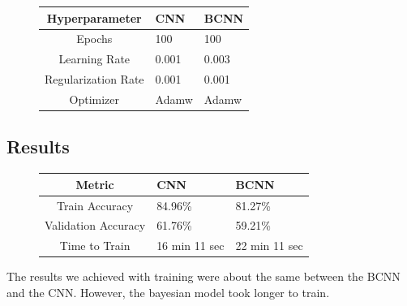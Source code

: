 \documentclass[12pt]{article}
\begin{document}
\begin{figure}[H]
	\begin{center}
	\begin{tabular}{|c||p{3cm}|p{3cm}|} %
	\hline
	\textbf{Hyperparameter} & \textbf{CNN} & \textbf{BCNN} \\ [0.5ex] 
	\hline\hline
	Epochs & 100 & 100\\
	\hline
	Learning Rate & 0.001  & 0.003  \\
	\hline
	Regularization Rate& 0.001 & 0.001 \\
	\hline
	Optimizer & Adamw  & Adamw  \\
	\hline
\end{tabular}
\end{center}
\end{figure}



\subsection{Results}

\begin{figure}[H]
	\centering
	\begin{tabular}{|c||p{3cm}|p{3cm}|} %
		\hline
		\textbf{Metric} & \textbf{CNN} & \textbf{BCNN} \\ [0.5ex] 
		\hline\hline
		Train Accuracy & 84.96\% & 81.27\%\\
		\hline
		Validation Accuracy & 61.76\%  & 59.21\%  \\
		\hline
		Time to Train & 16 min 11 sec  & 22 min 11 sec  \\
		\hline
	\end{tabular}
\end{figure}

The results we achieved with training were about the same between the BCNN and the CNN. However, the bayesian model took longer to train.
\end{document}
